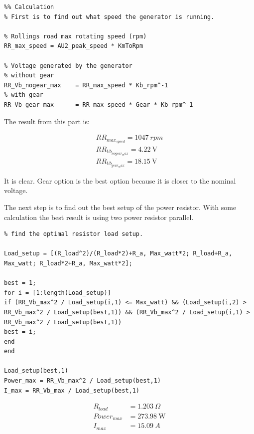 \lstset{language=MATLAB}
\begin{lstlisting}
%% Calculation
% First is to find out what speed the generator is running.

% Rollings road max rotating speed (rpm)
RR_max_speed = AU2_peak_speed * KmToRpm 

% Voltage generated by the generator
% without gear
RR_Vb_nogear_max    = RR_max_speed * Kb_rpm^-1
% with gear
RR_Vb_gear_max      = RR_max_speed * Gear * Kb_rpm^-1
\end{lstlisting}

The result from this part is:

\begin{equation}
\begin{split}
	RR_{max_{speed}} = \SI{1047}{rpm}\\
	RR_{Vb_{nogear_max}} = \SI{4.22}{\volt}\\
	RR_{Vb_{gear_max}} = \SI{18.15}{\volt}
\end{split}
\end{equation}

It is clear. Gear option is the best option because it is closer to the nominal voltage.

The next step is to find out the best setup of the power resistor. With some calculation the best result is using two power resistor parallel. 

\lstset{language=MATLAB}
\begin{lstlisting}
% find the optimal resistor load setup.

Load_setup = [(R_load^2)/(R_load*2)+R_a, Max_watt*2; R_load+R_a, Max_watt; R_load*2+R_a, Max_watt*2];

best = 1;
for i = [1:length(Load_setup)]
if (RR_Vb_max^2 / Load_setup(i,1) <= Max_watt) && (Load_setup(i,2) > RR_Vb_max^2 / Load_setup(best,1)) && (RR_Vb_max^2 / Load_setup(i,1) > RR_Vb_max^2 / Load_setup(best,1))
best = i; 
end
end

Load_setup(best,1)
Power_max = RR_Vb_max^2 / Load_setup(best,1)
I_max = RR_Vb_max / Load_setup(best,1)
\end{lstlisting}


\begin{equation}
	\begin{split}
		R_{load} &= \SI{1.203}{\Omega}\\
		Power_{max} &= \SI{273.98}{\watt}\\
		I_{max} &= \SI{15.09}{A}
	\end{split}
\end{equation}

